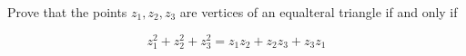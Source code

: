 Prove that the points $z_1, z_2, z_3$ are vertices of an equalteral triangle if and only if

$$z_1^2+z_2^2+z_3^2=z_1z_2+z_2z_3+z_3z_1$$